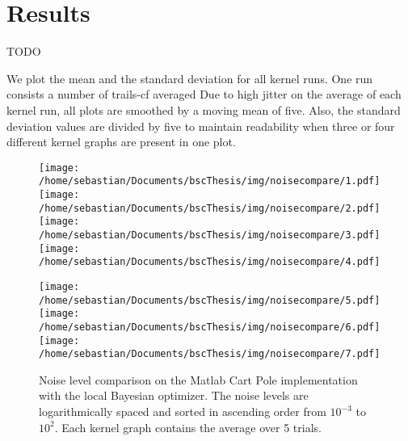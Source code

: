 \chapter{Results}
\label{chap:5}
%
TODO


We plot the mean and the standard deviation for all kernel runs. One run consists a number of trails-cf averaged  Due to high jitter on the average of each kernel run, all plots are smoothed by a moving mean of five. Also, the standard deviation values are divided by five to maintain readability when three or four different kernel graphs are present in one plot.

\begin{figure}[h]
\centering
\texttt{[image: /home/sebastian/Documents/bscThesis/img/noisecompare/1.pdf]}
\texttt{[image: /home/sebastian/Documents/bscThesis/img/noisecompare/2.pdf]}
\texttt{[image: /home/sebastian/Documents/bscThesis/img/noisecompare/3.pdf]}
\texttt{[image: /home/sebastian/Documents/bscThesis/img/noisecompare/4.pdf]}

\medskip

\texttt{[image: /home/sebastian/Documents/bscThesis/img/noisecompare/5.pdf]}
\texttt{[image: /home/sebastian/Documents/bscThesis/img/noisecompare/6.pdf]}
\texttt{[image: /home/sebastian/Documents/bscThesis/img/noisecompare/7.pdf]}

\caption{Noise level comparison on the Matlab Cart Pole implementation with the local Bayesian optimizer. The noise levels are logarithmically spaced and sorted in ascending order from $10^{-3}$ to $10^2$. Each kernel graph contains the average over 5 trials.}
\label{pics:blablabla}
\end{figure}
